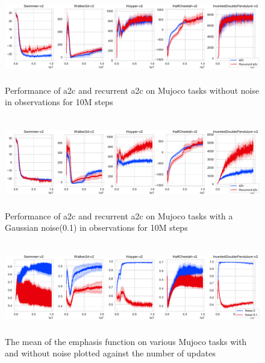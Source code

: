 \begin{figure}[h]
    \centering
    \includegraphics[width=\textwidth, height=4cm]{fig/Rewards_a2c_mujoco_sea_steps_5_noise_obs_0_0.pdf}
    \caption{Performance of a2c and recurrent a2c on Mujoco tasks without noise in observations for 10M steps}
    \label{fig:a2c_no_noise_full}
\end{figure}
\begin{figure}[h]
    \centering
    \includegraphics[width=\textwidth, height=4cm]{fig/Rewards_a2c_mujoco_sea_steps_5_noise_obs_0_1.pdf}
    \caption{Performance of a2c and recurrent a2c on Mujoco tasks with a Gaussian noise(0.1) in observations for 10M steps}
    \label{fig:a2c_noise_full}
\end{figure}

\begin{figure}[H]
    \centering
    \includegraphics[width=\textwidth, height=4cm]{fig/beta_mean_a2c_mujoco_sea_steps_5_noise_obs_0_1.pdf}
    \caption{The mean of the emphasis function on various Mujoco tasks with and without noise plotted against the number of updates}
    \label{fig:beta_mean_a2c_mujoco}
\end{figure}

